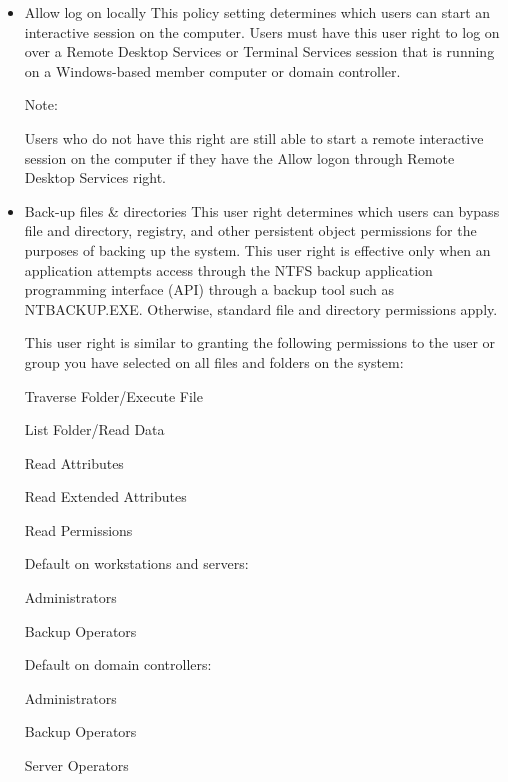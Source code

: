 \begin{itemize}
    \item Allow log on locally
This policy setting determines which users can start an interactive session on the computer. Users must have this user right to log on over a Remote Desktop Services or Terminal Services session that is running on a Windows-based member computer or domain controller.

Note:

Users who do not have this right are still able to start a remote interactive session on the computer if they have the Allow logon through Remote Desktop Services right.

    \item Back-up files \& directories
This user right determines which users can bypass file and directory, registry, and other persistent object permissions for the purposes of backing up the system. This user right is effective only when an application attempts access through the NTFS backup application programming interface (API) through a backup tool such as NTBACKUP.EXE. Otherwise, standard file and directory permissions apply.

This user right is similar to granting the following permissions to the user or group you have selected on all files and folders on the system:

Traverse Folder/Execute File

List Folder/Read Data

Read Attributes

Read Extended Attributes

Read Permissions

Default on workstations and servers:

Administrators

Backup Operators

Default on domain controllers:

Administrators

Backup Operators

Server Operators


\end{itemize}
